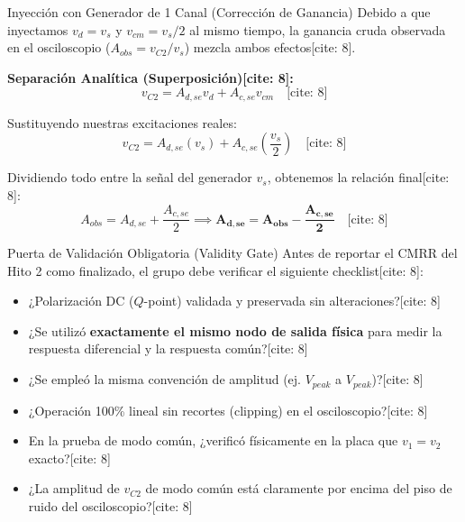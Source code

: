 \documentclass[aspectratio=169]{beamer}
\begin{document}
\begin{frame}{Inyección con Generador de 1 Canal (Corrección de Ganancia)}
    Debido a que inyectamos $v_d = v_s$ y $v_{cm} = v_s/2$ al mismo tiempo, la ganancia cruda observada en el osciloscopio ($A_{obs} = v_{C2} / v_s$) mezcla ambos efectos[cite: 8].
    
    \vspace{0.3cm}
    \textbf{Separación Analítica (Superposición)[cite: 8]:}
    \begin{equation*}
        v_{C2} = A_{d,se} v_d + A_{c,se} v_{cm} \quad \text{[cite: 8]}
    \end{equation*}
    
    Sustituyendo nuestras excitaciones reales:
    \begin{equation*}
        v_{C2} = A_{d,se} (v_s) + A_{c,se} \left(\frac{v_s}{2}\right) \quad \text{[cite: 8]}
    \end{equation*}
    
    Dividiendo todo entre la señal del generador $v_s$, obtenemos la relación final[cite: 8]:
    \begin{equation*}
        A_{obs} = A_{d,se} + \frac{A_{c,se}}{2} \implies \mathbf{A_{d,se} = A_{obs} - \frac{A_{c,se}}{2}} \quad \text{[cite: 8]}
    \end{equation*}
\end{frame}

\begin{frame}{Puerta de Validación Obligatoria (Validity Gate)}
    Antes de reportar el CMRR del Hito 2 como finalizado, el grupo debe verificar el siguiente checklist[cite: 8]:
    
    \vspace{0.3cm}
    \begin{itemize}
        \item[\checkmark] ¿Polarización DC ($Q$-point) validada y preservada sin alteraciones?[cite: 8]
        \item[\checkmark] ¿Se utilizó \textbf{exactamente el mismo nodo de salida física} para medir la respuesta diferencial y la respuesta común?[cite: 8]
        \item[\checkmark] ¿Se empleó la misma convención de amplitud (ej. $V_{peak}$ a $V_{peak}$)?[cite: 8]
        \item[\checkmark] ¿Operación 100\% lineal sin recortes (clipping) en el osciloscopio?[cite: 8]
        \item[\checkmark] En la prueba de modo común, ¿verificó físicamente en la placa que $v_1 = v_2$ exacto?[cite: 8]
        \item[\checkmark] ¿La amplitud de $v_{C2}$ de modo común está claramente por encima del piso de ruido del osciloscopio?[cite: 8]
    \end{itemize}
\end{frame}
\end{document}
